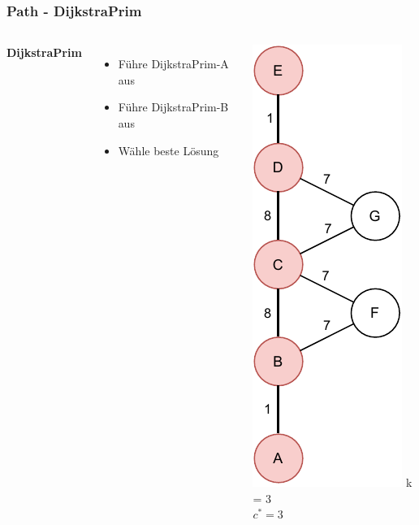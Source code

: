 \documentclass[aspectratio=169]{beamer}
\begin{document}
\begin{frame}
	\frametitle{Path - DijkstraPrim}
	\begin{columns}[c] %
		
		\textbf{DijkstraPrim}
		\begin{itemize}
			\item Führe DijkstraPrim-A aus
			\item Führe DijkstraPrim-B aus
			\item Wähle beste Lösung 
		\end{itemize}
		\includegraphics[scale=.5]{path_optimal.pdf}
		k = 3\\
		$c^* = 3$
		
		
	\end{columns}
	\end{frame}
	
\end{document}
